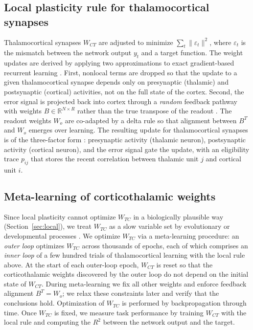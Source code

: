\documentclass[11pt]{article}
\begin{document}
\subsection{Local plasticity rule for thalamocortical synapses}

Thalamocortical synapses $W_{CT}$ are adjusted to minimize
$\sum_t \|\varepsilon_t\|^2$, where $\varepsilon_t$ is the mismatch
between the network output $y_t$ and a target function. The weight
updates are derived by applying two approximations to exact
gradient-based recurrent learning \cite{williams1989learning}. First,
nonlocal terms are dropped so that the update to a given
thalamocortical synapse depends only on presynaptic (thalamic) and
postsynaptic (cortical) activities, not on the full state of the
cortex. Second, the error signal is projected back into cortex through
a \emph{random} feedback pathway with weights $B \in \mathbb{R}^{N
\times R}$ rather than the true transpose of the readout
\cite{lillicrap2016random}. The readout weights $W_o$ are co-adapted
by a delta rule so that alignment between $B^T$ and $W_o$ emerges over
learning. The resulting update for thalamocortical synapses is of the
three-factor form \cite{murray2019local, gerstner2018eligibility}:
presynaptic activity (thalamic neuron), postsynaptic activity
(cortical neuron), and the error signal gate the update, with an
eligibility trace $p_{ij}$ that stores the recent correlation between
thalamic unit $j$ and cortical unit $i$.

\subsection{Meta-learning of corticothalamic weights}

Since local plasticity cannot optimize $W_{TC}$ in a biologically
plausible way (Section~\ref{sec:local}), we treat $W_{TC}$ as a slow
variable set by evolutionary or developmental processes
\cite{wang2018prefrontal, hospedales2022meta}. We optimize $W_{TC}$ via
a meta-learning procedure: an \emph{outer loop} optimizes $W_{TC}$
across thousands of epochs, each of which comprises an \emph{inner
loop} of a few hundred trials of thalamocortical learning with the
local rule above. At the start of each outer-loop epoch, $W_{CT}$ is
reset so that the corticothalamic weights discovered by the outer loop
do not depend on the initial state of $W_{CT}$. During meta-learning we
fix all other weights and enforce feedback alignment $B^T = W_o$; we
relax these constraints later and verify that the conclusions hold.
Optimization of $W_{TC}$ is performed by backpropagation through time.
Once $W_{TC}$ is fixed, we measure task performance by training
$W_{CT}$ with the local rule and computing the $R^2$ between the
network output and the target.
\end{document}
